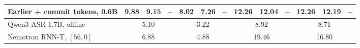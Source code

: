 \begin{table}[t]
\begin{tabular}{@{}lcccccccccccc@{}}
    Earlier + commit tokens, 0.6B  & 9.88 & 9.15 & --   & 8.02 & 7.26 & --   & 12.26 & 12.04 & --   & 12.26 & 12.19 & --   \\
    \midrule
    Qwen3-ASR-1.7B, offline        & \multicolumn{3}{c}{5.10} & \multicolumn{3}{c}{3.22} & \multicolumn{3}{c}{8.92}  & \multicolumn{3}{c}{8.71}  \\
    Nemotron RNN-T, $[56,0]$       & \multicolumn{3}{c}{6.88} & \multicolumn{3}{c}{4.88} & \multicolumn{3}{c}{19.46} & \multicolumn{3}{c}{16.80} \\
    \bottomrule
  \end{tabular}
\end{table}
